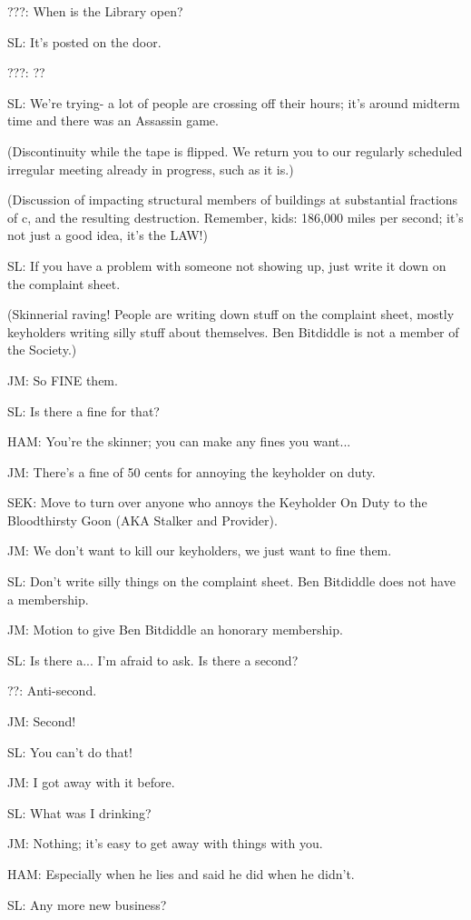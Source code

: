 \documentclass[12pt]{article}
\begin{document}
???: When is the Library open?

SL: It's posted on the door.

???: ??

SL: We're trying- a lot of people are crossing off their hours; it's around midterm time and there was an Assassin game.

(Discontinuity while the tape is flipped. We return you to our regularly scheduled irregular meeting already in progress, such as it is.)

(Discussion of impacting structural members of buildings at substantial fractions of c, and the resulting destruction. Remember, kids: 186,000 miles per second; it's not just a good idea, it's the LAW!)

SL: If you have a problem with someone not showing up, just write it down on the complaint sheet.

(Skinnerial raving! People are writing down stuff on the complaint sheet, mostly keyholders writing silly stuff about themselves. Ben Bitdiddle is not a member of the Society.)

JM: So FINE them.

SL: Is there a fine for that?

HAM: You're the skinner; you can make any fines you want...

JM: There's a fine of 50 cents for annoying the keyholder on duty.

SEK: Move to turn over anyone who annoys the Keyholder On Duty to the Bloodthirsty Goon (AKA Stalker and Provider).

JM: We don't want to kill our keyholders, we just want to fine them.

SL: Don't write silly things on the complaint sheet. Ben Bitdiddle does not have a membership.

JM: Motion to give Ben Bitdiddle an honorary membership.

SL: Is there a... I'm afraid to ask. Is there a second?

??: Anti-second.

JM: Second!

SL: You can't do that!

JM: I got away with it before.

SL: What was I drinking?

JM: Nothing; it's easy to get away with things with you.

HAM: Especially when he lies and said he did when he didn't.

SL: Any more new business?
\end{document}
